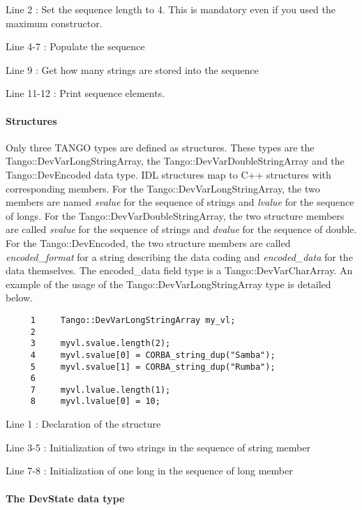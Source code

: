 Line 2 : Set the sequence length to 4. This is mandatory even if you
used the maximum constructor.

Line 4-7 : Populate the sequence

Line 9 : Get how many strings are stored into the sequence

Line 11-12 : Print sequence elements.


\paragraph{Structures}

Only three TANGO types are defined as structures. These types are
the Tango::DevVarLongStringArray,
the Tango::DevVarDoubleStringArray
and the Tango::DevEncoded data type. IDL
structures map to C++ structures with corresponding members. For the
Tango::DevVarLongStringArray, the two members are named \emph{svalue}
for the sequence of strings and \emph{lvalue} for the
sequence of longs. For the Tango::DevVarDoubleStringArray, the two
structure members are called \emph{svalue} for the sequence of strings
and \emph{dvalue} for the sequence of double. For the
Tango::DevEncoded, the two structure members are called \emph{encoded\_format}
for a string describing the data coding and \emph{encoded\_data}
for the data themselves. The encoded\_data field type is a Tango::DevVarCharArray.
An example of the usage of the Tango::DevVarLongStringArray type is
detailed below.


\begin{verbatim}
     1     Tango::DevVarLongStringArray my_vl;
     2  
     3     myvl.svalue.length(2);
     4     myvl.svalue[0] = CORBA_string_dup("Samba");
     5     myvl.svalue[1] = CORBA_string_dup("Rumba");
     6  
     7     myvl.lvalue.length(1);
     8     myvl.lvalue[0] = 10;
\end{verbatim}


Line 1 : Declaration of the structure

Line 3-5 : Initialization of two strings in the sequence of string
member

Line 7-8 : Initialization of one long in the sequence of long member


\paragraph{The DevState data type}

